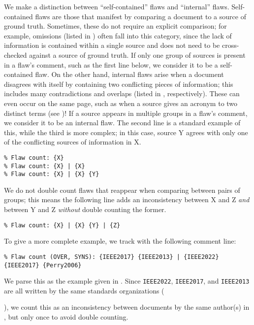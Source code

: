 We make a distinction between ``self-contained'' flaws and ``internal'' flaws.
Self-contained flaws are those that manifest by comparing a document to a
source of ground truth. Sometimes, these do not require an explicit comparison;
for example, omissions (listed in ) often fall into this category,
since the lack of information is contained within a single source and does not
need to be cross-checked against a source of ground truth. If only one group of
sources is present in a flaw's comment, such as the first line below, we
consider it to be a self-contained flaw. On the other hand, internal flaws
arise when a document disagrees with itself by containing two conflicting
pieces of information; this includes many contradictions and overlaps (listed
in , respectively). These can even occur on the same page,
such as when a source gives an acronym to two distinct terms
(see )! If a
source appears in multiple groups in a flaw's comment, we consider it to
be an internal flaw. The second line is a standard example of this, while the
third is more complex; in this case, source Y agrees with only one of the
conflicting sources of information in X.
\begin{displayquote}
    \texttt{\% Flaw count: \{X\}\\\% Flaw count: \{X\} | \{X\}\\
        \% Flaw count: \{X\} | \{X\} \{Y\}}
\end{displayquote}
We do not double count flaws that reappear when comparing between pairs of
groups; this means the following line adds an inconsistency between X and Z
\emph{and} between Y and Z \emph{without} double counting the former.
\begin{displayquote}
    \texttt{\% Flaw count: \{X\} | \{X\} \{Y\} | \{Z\}}
\end{displayquote}
To give a more complete example, we track  with the
following comment line:\utd{}
\begin{displayquote}
    \texttt{\% Flaw count (OVER, SYNS): \{IEEE2017\} \{IEEE2013\} | \{IEEE2022\}
        \displayNL{} \{IEEE2017\} \{Perry2006\}}
\end{displayquote}%
We parse this as the example given in . Since
\texttt{IEEE2022}, \texttt{IEEE2017}, and \texttt{IEEE2013} are all written by
the same standards
organizations (\begin{NoHyper}\citeauthor{IEEE2022}\end{NoHyper}), we count
this as an inconsistency between documents by the same author(s) in
, but only once to avoid double counting.

